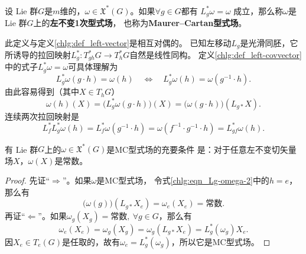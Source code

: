 \begin{definition}\label{chlg:def_left-covvector}
    设 Lie 群$G$是$m$维的，$\omega\in \mathfrak{X}^*(G)$。如果$\forall g\in G$都有
    $  L_g^* \omega = \omega $
    成立，那么称$\omega$是 Lie 群$G$上的\textbf{左不变1次型式场}，
    也称为\textbf{\bfseries Maurer--Cartan型式场}。
\end{definition}
此定义与定义\ref{chlg:def_left-vector}是相互对偶的。
已知左移动$L_g$是光滑同胚，它所诱导的拉回映射$L_g^*:T^*_{gh}G \to T^*_hG$自然是线性同构。
定义\eqref{chlg:def_left-covvector}中的式子$  L_g^* \omega = \omega $可具体理解为
\begin{equation}\label{chlg:eqn_Lg-omega-1}
    L_g^* \omega(g\cdot h)= \omega(h) \quad \Leftrightarrow\quad
    L_g^* \omega(h)= \omega(g^{-1}\cdot h).
\end{equation}
由此容易得到（其中$X\in T_h G$）
\begin{equation}\label{chlg:eqn_Lg-omega-2}
    \omega(h) (X)=\bigl(L_g^* \omega(g\cdot h)\bigr) (X)
    =\bigl(\omega(g\cdot h)\bigr)(L_{g*}X) .
\end{equation}
连续两次拉回映射是
\begin{equation}\label{chlg:eqn_Lg-omega-3}
    L_f^* L_g^* \omega(h)=L_f^* \omega(g^{-1}\cdot h)=\omega(f^{-1}\cdot g^{-1}\cdot h)
    =L_{gf}^* \omega(h).
\end{equation}




\begin{theorem}\label{chlg:thm_left-1form}
    有 Lie 群$G$上的$\omega\in \mathfrak{X}^*(G)$是MC型式场的充要条件
    是：对于任意左不变切矢量场$X$，$\omega(X)$是常数。
\end{theorem}
\begin{proof}
    先证“$\Rightarrow$”。如果$\omega$是MC型式场，
    令式\eqref{chlg:eqn_Lg-omega-2}中的$h=e$，那么有
    \begin{equation}
        \bigl(\omega(g)\bigr)(L_{g*}X_e)=\omega_e (X_e)=\text{常数}.
    \end{equation}
    再证“$\Leftarrow$”。如果$\omega_g (X_g)=\text{常数},\ \forall g\in G$，那么有
    \begin{equation}
        \omega_e (X_e) = \omega_g (X_g) =\omega_g (L_{g*}X_e) = L_g^* (\omega_g) X_e. 
    \end{equation}
    因$X_e\in T_e(G)$是任取的，故有$\omega_e=L_g^* (\omega_g)$，所以它是MC型式场。
\end{proof}



